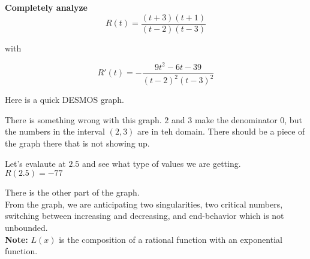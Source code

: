 \documentclass{ximera}
\begin{document}
\begin{example}

\textbf{\textcolor{purple!85!blue}{Completely analyze}} \\


\[   R(t) = \frac{(t+3)(t+1)}{(t-2)(t-3)} \]

with 

\[   R'(t) = -\frac{9 t^2 -6 t -39}{(t-2)^2 (t-3)^2} \]






Here is a quick DESMOS graph.


\begin{center}
\end{center}


There is something wrong with this graph.  $2$ and $3$ make the denominator $0$, but the numbers in the interval $(2, 3)$ are in teh domain.  There should be a piece of the graph there that is not showing up.


Let's evalaute at $2.5$ and see what type of values we are getting. \\

$R(2.5) = -77$


\begin{center}
\end{center}


There is the other part of the graph. \\



From the graph, we are anticipating two singularities, two critical numbers, switching between increasing and decreasing, and end-behavior which is not unbounded. \\



































\textbf{Note:} $L(x)$ is the composition of a rational function with an exponential function.


\end{example}
\end{document}
